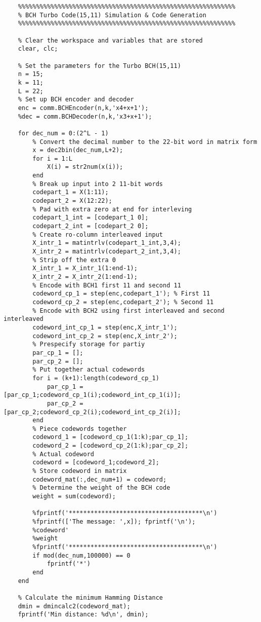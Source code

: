 \documentclass{article}
\begin{document}
\begin{lstlisting}
	%%%%%%%%%%%%%%%%%%%%%%%%%%%%%%%%%%%%%%%%%%%%%%%%%%%%%%%%%%%%
	% BCH Turbo Code(15,11) Simulation & Code Generation
	%%%%%%%%%%%%%%%%%%%%%%%%%%%%%%%%%%%%%%%%%%%%%%%%%%%%%%%%%%%%
	
	% Clear the workspace and variables that are stored
	clear, clc;
	
	% Set the parameters for the Turbo BCH(15,11)
	n = 15;
	k = 11;
	L = 22;
	% Set up BCH encoder and decoder
	enc = comm.BCHEncoder(n,k,'x4+x+1');
	%dec = comm.BCHDecoder(n,k,'x3+x+1');
	
	for dec_num = 0:(2^L - 1)
		% Convert the decimal number to the 22-bit word in matrix form
		x = dec2bin(dec_num,L+2);
		for i = 1:L
			X(i) = str2num(x(i));
		end
		% Break up input into 2 11-bit words
		codepart_1 = X(1:11);
		codepart_2 = X(12:22);
		% Pad with extra zero at end for interleving
		codepart_1_int = [codepart_1 0];
		codepart_2_int = [codepart_2 0];
		% Create ro-column interleaved input
		X_intr_1 = matintrlv(codepart_1_int,3,4);
		X_intr_2 = matintrlv(codepart_2_int,3,4);
		% Strip off the extra 0
		X_intr_1 = X_intr_1(1:end-1);
		X_intr_2 = X_intr_2(1:end-1);
		% Encode with BCH1 first 11 and second 11 
		codeword_cp_1 = step(enc,codepart_1'); % First 11
		codeword_cp_2 = step(enc,codepart_2'); % Second 11
		% Encode with BCH2 using first interleaved and second interleaved 
		codeword_int_cp_1 = step(enc,X_intr_1');
		codeword_int_cp_2 = step(enc,X_intr_2');
		% Prespecify storage for partiy
		par_cp_1 = [];
		par_cp_2 = [];
		% Put together actual codewords
		for i = (k+1):length(codeword_cp_1)
			par_cp_1 = [par_cp_1;codeword_cp_1(i);codeword_int_cp_1(i)];
			par_cp_2 = [par_cp_2;codeword_cp_2(i);codeword_int_cp_2(i)];
		end
		% Piece codewords together
		codeword_1 = [codeword_cp_1(1:k);par_cp_1];
		codeword_2 = [codeword_cp_2(1:k);par_cp_2];
		% Actual codeword
		codeword = [codeword_1;codeword_2];
		% Store codeword in matrix
		codeword_mat(:,dec_num+1) = codeword;
		% Determine the weight of the BCH code
		weight = sum(codeword);
	
		%fprintf('*************************************\n')
		%fprintf(['The message: ',x]); fprintf('\n');
		%codeword'
		%weight
		%fprintf('*************************************\n')
		if mod(dec_num,100000) == 0
			fprintf('*')
		end
	end
	
	% Calculate the minimum Hamming Distance
	dmin = dmincalc2(codeword_mat);
	fprintf('Min distance: %d\n', dmin);
\end{lstlisting}
\end{document}
